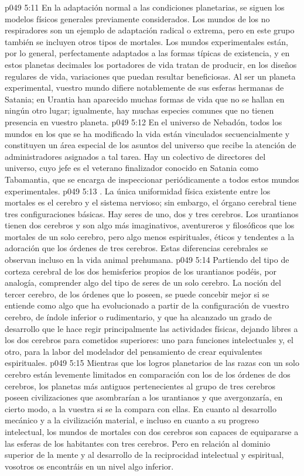 \vs p049 5:11 En la adaptación normal a las condiciones planetarias, se siguen los modelos físicos generales previamente considerados. Los mundos de los no respiradores son un ejemplo de adaptación radical o extrema, pero en este grupo también se incluyen otros tipos de mortales. Los mundos experimentales están, por lo general, perfectamente adaptados a las formas típicas de existencia, y en estos planetas decimales los portadores de vida tratan de producir, en los diseños regulares de vida, variaciones que puedan resultar beneficiosas. Al ser un planeta experimental, vuestro mundo difiere notablemente de sus esferas hermanas de Satania; en Urantia han aparecido muchas formas de vida que no se hallan en ningún otro lugar; igualmente, hay muchas especies comunes que no tienen presencia en vuestro planeta.
\vs p049 5:12 En el universo de Nebadón, todos los mundos en los que se ha modificado la vida están vinculados secuencialmente y constituyen un área especial de los asuntos del universo que recibe la atención de administradores asignados a tal tarea. Hay un colectivo de directores del universo, cuyo jefe es el veterano finalizador conocido en Satania como Tabamantia, que se encarga de inspeccionar periódicamente a todos estos mundos experimentales.
\vs p049 5:13 . La única uniformidad física existente entre los mortales es el cerebro y el sistema nervioso; sin embargo, el órgano cerebral tiene tres configuraciones básicas. Hay seres de uno, dos y tres cerebros. Los urantianos tienen dos cerebros y son algo más imaginativos, aventureros y filosóficos que los mortales de un solo cerebro, pero algo menos espirituales, éticos y tendentes a la adoración que los órdenes de tres cerebros. Estas diferencias cerebrales se observan incluso en la vida animal prehumana.
\vs p049 5:14 Partiendo del tipo de corteza cerebral de los dos hemisferios propios de los urantianos podéis, por analogía, comprender algo del tipo de seres de un solo cerebro. La noción del tercer cerebro, de los órdenes que lo poseen, se puede concebir mejor si se entiende como algo que ha evolucionado a partir de la configuración de vuestro cerebro, de índole inferior o rudimentario, y que ha alcanzado un grado de desarrollo que le hace regir principalmente las actividades físicas, dejando libres a los dos cerebros para cometidos superiores: uno para funciones intelectuales y, el otro, para la labor del modelador del pensamiento de crear equivalentes espirituales.
\vs p049 5:15 Mientras que los logros planetarios de las razas con un solo cerebro están levemente limitados en comparación con los de los órdenes de dos cerebros, los planetas más antiguos pertenecientes al grupo de tres cerebros poseen civilizaciones que asombrarían a los urantianos y que avergonzaría, en cierto modo, a la vuestra si se la compara con ellas. En cuanto al desarrollo mecánico y a la civilización material, e incluso en cuanto a su progreso intelectual, los mundos de mortales con dos cerebros son capaces de equipararse a las esferas de los habitantes con tres cerebros. Pero en relación al dominio superior de la mente y al desarrollo de la reciprocidad intelectual y espiritual, vosotros os encontráis en un nivel algo inferior.
